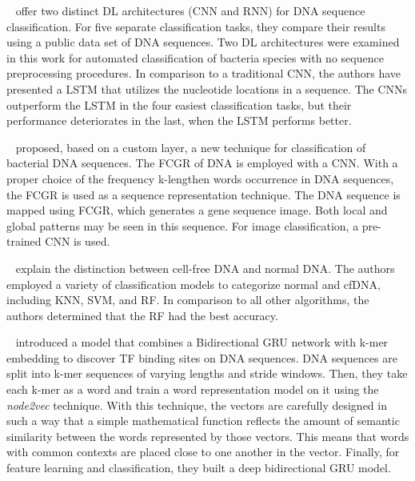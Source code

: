 \citeauthor{LoBosco2017DeepClassification}~\cite{LoBosco2017DeepClassification} offer two distinct \gls{DL} architectures (\gls{CNN} and \gls{RNN}) for \gls{DNA} sequence classification. For five separate classification tasks, they compare their results using a public data set of \gls{DNA} sequences. Two \gls{DL} architectures were examined in this work for automated classification of bacteria species with no sequence preprocessing procedures. In comparison to a traditional \gls{CNN}, the authors have presented a \gls{LSTM} that utilizes the nucleotide locations in a sequence. The \gls{CNN}s outperform the \gls{LSTM} in the four easiest classification tasks, but their performance deteriorates in the last, when the \gls{LSTM} performs better. %

\citeauthor{Abd-Alhalem2020BacterialLayers}~\cite{Abd-Alhalem2020BacterialLayers} proposed, based on a custom layer, a new technique for classification of bacterial \gls{DNA} sequences. The \gls{FCGR} of \gls{DNA} is employed with a \gls{CNN}. With a proper choice of the frequency k-lengthen words occurrence in \gls{DNA} sequences, the \gls{FCGR} is used as a sequence representation technique. The \gls{DNA} sequence is mapped using \gls{FCGR}, which generates a gene sequence image. Both local and global patterns may be seen in this sequence. For image classification, a pre-trained \gls{CNN} is used. 

\citeauthor{Chen2017AClassification}~\cite{Chen2017AClassification} explain the distinction between cell-free DNA and normal DNA. The authors employed a variety of classification models to categorize normal and cfDNA, including \gls{KNN}, \gls{SVM}, and \gls{RF}. In comparison to all other algorithms, the authors determined that the \gls{RF} had the best accuracy. %

\citeauthor{Shen2018RecurrentSites}~\cite{Shen2018RecurrentSites} introduced a model that combines a Bidirectional \gls{GRU} network with k-mer embedding to discover \gls{TF} binding sites on \gls{DNA} sequences. \gls{DNA} sequences are split into k-mer sequences of varying lengths and stride windows. Then, they take each k-mer as a word and train a word representation model on it using the \textit{node2vec} technique. With this technique, the vectors are carefully designed in such a way that a simple mathematical function reflects the amount of semantic similarity between the words represented by those vectors. This means that words with common contexts are placed close to one another in the vector. Finally, for feature learning and classification, they built a deep bidirectional \gls{GRU} model.


